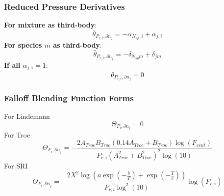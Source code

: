 \documentclass[a4paper,10pt]{article}
\newcommand{\ns}{N_{sp}}
\begin{document}
\subsubsection{Reduced Pressure Derivatives}
\textbf{For mixture as third-body}:
\begin{dmath} \bar{\theta}_{P_{r, i}, \partial n_j} = - \alpha_{\ns,i} + \alpha_{j,i}\end{dmath} 
\textbf{For species $m$ as third-body}:
\begin{dmath} \bar{\theta}_{P_{r, i}, \partial n_j} = - \delta_{\ns m} + \delta_{j m}\end{dmath} 
\textbf{If all $\alpha_{j,i} = 1$}:
\begin{dmath} \bar{\theta}_{P_{r, i}, \partial n_j} = 0\end{dmath} 
\subsubsection{Falloff Blending Function Forms}
For Lindemann
\begin{dmath} \Theta_{F_i, \partial n_j} = 0\end{dmath} 
For Troe
\begin{dmath} \Theta_{F_i, \partial n_j} = - \frac{2 A_{Troe} B_{Troe} \left(0.14 A_{Troe} + B_{Troe}\right) \log{\left (F_{cent} \right )}}{P_{r, i} \left(A_{Troe}^{2} + B_{Troe}^{2}\right)^{2} \log{\left (10 \right )}}\end{dmath} 
For SRI
\begin{dmath} \Theta_{F_i, \partial n_j} = - \frac{2 X^{2} \log{\left (a \operatorname{exp}\left({- \frac{b}{T}}\right) + \operatorname{exp}\left({- \frac{T}{c}}\right) \right )}}{P_{r, i} \log^{2}{\left (10 \right )}} \log{\left (P_{r, i} \right )}\end{dmath} 
\end{document}
